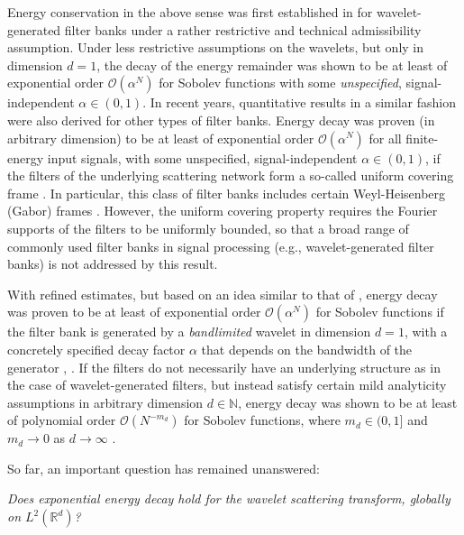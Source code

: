 \documentclass[11pt]{amsart}
\newcommand{\R}{{\mathbb{R}}}
\newcommand{\N}{\mathbb{N}}
\newenvironment{proof sketch} {\textit{Proof sketch.}}{}
\begin{document}
  Energy conservation in the above sense was first established in \cite[Theorem 2.6]{mallat2012group} for wavelet-generated filter banks under a rather restrictive and technical admissibility assumption. Under less restrictive assumptions on the wavelets, but only in dimension $d=1$, the decay of the energy remainder was shown \cite[Theorem 3.1]{waldspurger2017exponential} to be at least of exponential order $\mathcal{O}(\alpha^{N})$ for Sobolev functions with some \textit{unspecified}, signal-independent $\alpha \in (0,1)$. In recent years, quantitative results in a similar fashion were also derived for other types of filter banks. Energy decay was proven (in arbitrary dimension) to be at least of exponential order $\mathcal{O}(\alpha^{N})$ for all finite-energy input signals, with some unspecified, signal-independent $\alpha \in (0,1)$, if the filters of the underlying scattering network form a so-called uniform covering frame \cite[Proposition 3.1]{czaja2019analysis}. In particular, this class of filter banks includes certain Weyl-Heisenberg (Gabor) frames \cite[Proposition 2.3]{czaja2019analysis}. However, the uniform covering property requires the Fourier supports of the filters to be uniformly bounded, so that a broad range of commonly used filter banks in signal processing (e.g., wavelet-generated filter banks) is not addressed by this result. 
  
  With refined estimates, but based on an idea similar to that of \cite[Theorem 3.1]{waldspurger2017exponential}, energy decay was proven to be at least of exponential order $\mathcal{O}(\alpha^{N})$ for Sobolev functions if the filter bank is generated by a \textit{bandlimited} wavelet in dimension $d=1$, with a concretely specified decay factor $\alpha$ that depends on the bandwidth of the generator \cite[Theorem 2]{wiatowski2017energy}, \cite[Theorem 3.1]{wiatowski2017topology}. If the filters do not necessarily have an underlying structure as in the case of wavelet-generated filters, but instead satisfy certain mild analyticity assumptions in arbitrary dimension $d \in \N$, energy decay was shown to be at least of polynomial order $\mathcal{O}(N^{-m_d})$ for Sobolev functions, where $m_d \in (0,1]$ and $m_d \to 0$ as $d \to \infty$ \cite[Theorem 1]{wiatowski2017energy}. 
  
  So far, an important question has remained unanswered: 
  
  \textit{Does exponential energy decay hold for the wavelet scattering transform, globally on $L^2(\R^d)$?}
  
\end{document}
